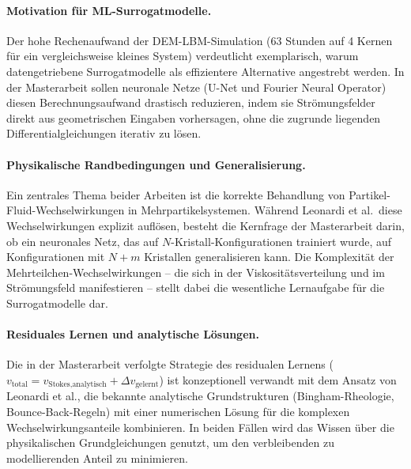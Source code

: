\documentclass[a4paper,12pt]{article}
\begin{document}
\paragraph{Motivation für ML-Surrogatmodelle.}
Der hohe Rechenaufwand der DEM-LBM-Simulation (63 Stunden auf 4 Kernen für ein vergleichsweise kleines System) verdeutlicht exemplarisch, warum datengetriebene Surrogatmodelle als effizientere Alternative angestrebt werden. In der Masterarbeit sollen neuronale Netze (U-Net und Fourier Neural Operator) diesen Berechnungsaufwand drastisch reduzieren, indem sie Strömungsfelder direkt aus geometrischen Eingaben vorhersagen, ohne die zugrunde liegenden Differentialgleichungen iterativ zu lösen.

\paragraph{Physikalische Randbedingungen und Generalisierung.}
Ein zentrales Thema beider Arbeiten ist die korrekte Behandlung von Partikel-Fluid-Wechselwirkungen in Mehrpartikelsystemen. Während Leonardi et al.\ diese Wechselwirkungen explizit auflösen, besteht die Kernfrage der Masterarbeit darin, ob ein neuronales Netz, das auf $N$-Kristall-Konfigurationen trainiert wurde, auf Konfigurationen mit $N+m$ Kristallen generalisieren kann. Die Komplexität der Mehr\-teilchen-Wechselwirkungen -- die sich in der Viskositätsverteilung und im Strömungsfeld manifestieren -- stellt dabei die wesentliche Lernaufgabe für die Surrogatmodelle dar.

\paragraph{Residuales Lernen und analytische Lösungen.}
Die in der Masterarbeit verfolgte Strategie des residualen Lernens ($v_\text{total} = v_\text{Stokes,analytisch} + \Delta v_\text{gelernt}$) ist konzeptionell verwandt mit dem Ansatz von Leonardi et al., die bekannte analytische Grundstrukturen (Bingham-Rheologie, Bounce-Back-Regeln) mit einer numerischen Lösung für die komplexen Wechselwirkungsanteile kombinieren. In beiden Fällen wird das Wissen über die physikalischen Grundgleichungen genutzt, um den verbleibenden zu modellierenden Anteil zu minimieren.
\end{document}
